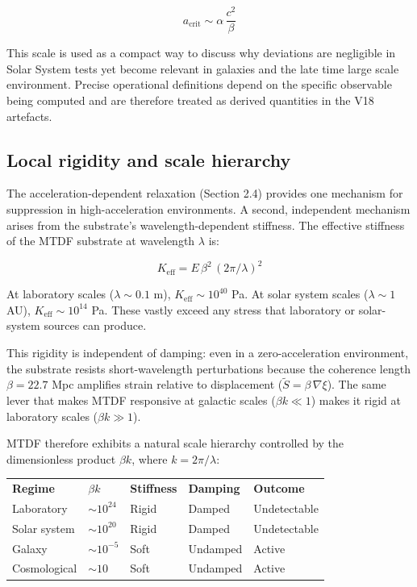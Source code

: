 \documentclass[11pt,a4paper]{article}
\begin{document}
\[
a_\mathrm{crit} \sim \alpha\,\frac{c^2}{\beta}
\]

This scale is used as a compact way to discuss why deviations are negligible in Solar System tests yet become relevant in galaxies and the late time large scale environment. Precise operational definitions depend on the specific observable being computed and are therefore treated as derived quantities in the V18 artefacts.

\subsection{Local rigidity and scale hierarchy}
The acceleration-dependent relaxation (Section 2.4) provides one mechanism for suppression in high-acceleration environments. A second, independent mechanism arises from the substrate's wavelength-dependent stiffness. The effective stiffness of the MTDF substrate at wavelength \(\lambda\) is:

\[
K_{\mathrm{eff}} = E\,\beta^2\,(2\pi/\lambda)^2
\]

At laboratory scales (\(\lambda \sim 0.1\) m), \(K_{\mathrm{eff}} \sim 10^{40}\) Pa. At solar system scales (\(\lambda \sim 1\) AU), \(K_{\mathrm{eff}} \sim 10^{14}\) Pa. These vastly exceed any stress that laboratory or solar-system sources can produce.

This rigidity is independent of damping: even in a zero-acceleration environment, the substrate resists short-wavelength perturbations because the coherence length \(\beta = 22.7\) Mpc amplifies strain relative to displacement (\(\tilde{S} = \beta\,\nabla\xi\)). The same lever that makes MTDF responsive at galactic scales (\(\beta k \ll 1\)) makes it rigid at laboratory scales (\(\beta k \gg 1\)).

MTDF therefore exhibits a natural scale hierarchy controlled by the dimensionless product \(\beta k\), where \(k = 2\pi/\lambda\):

\begin{table}[H]
\centering
\footnotesize
\begin{tabularx}{\linewidth}{l>{\RaggedRight\arraybackslash}X>{\RaggedRight\arraybackslash}X>{\RaggedRight\arraybackslash}X>{\RaggedRight\arraybackslash}X}
\toprule
\textbf{Regime} & \textbf{\(\beta k\)} & \textbf{Stiffness} & \textbf{Damping} & \textbf{Outcome} \tabularnewline
Laboratory & \(\sim 10^{24}\) & Rigid & Damped & Undetectable \tabularnewline
Solar system & \(\sim 10^{20}\) & Rigid & Damped & Undetectable \tabularnewline
Galaxy & \(\sim 10^{-5}\) & Soft & Undamped & Active \tabularnewline
Cosmological & \(\sim 10\) & Soft & Undamped & Active \tabularnewline
\bottomrule
\end{tabularx}
\end{table}
\end{document}
